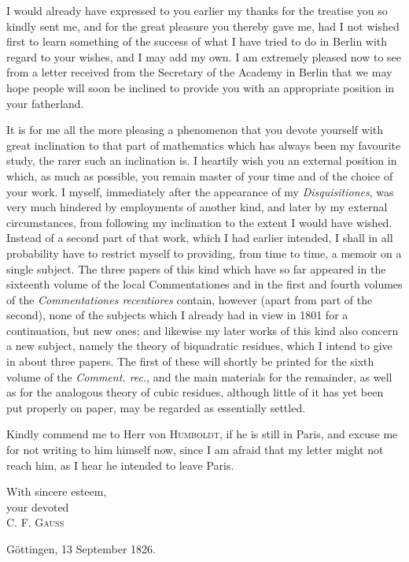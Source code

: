 \documentclass[11pt]{article}
\newcommand{\scn}[1]{\textsc{#1}}
\begin{document}
I would already have expressed to you earlier my thanks for the treatise you so kindly sent me, and for the great pleasure you thereby gave me, had I not wished first to learn something of the success of what I have tried to do in Berlin with regard to your wishes, and I may add my own. I am extremely pleased now to see from a letter received from the Secretary of the Academy in Berlin that we may hope people will soon be inclined to provide you with an appropriate position in your fatherland.

It is for me all the more pleasing a phenomenon that you devote yourself with great inclination to that part of mathematics which has always been my favourite study, the rarer such an inclination is. I heartily wish you an external position in which, as much as possible, you remain master of your time and of the choice of your work. I myself, immediately after the appearance of my \emph{Disquisitiones}, was very much hindered by employments of another kind, and later by my external circumstances, from following my inclination to the extent I would have wished. Instead of a second part of that work, which I had earlier intended, I shall in all probability have to restrict myself to providing, from time to time, a memoir on a single subject. The three papers of this kind which have so far appeared in the sixteenth volume of the local Commentationes and in the first and fourth volumes of the \emph{Commentationes recentiores} contain, however (apart from part of the second), none of the subjects which I already had in view in 1801 for a continuation, but new ones; and likewise my later works of this kind also concern a new subject, namely the theory of biquadratic residues, which I intend to give in about three papers. The first of these will shortly be printed for the sixth volume of the \emph{Comment. rec.}, and the main materials for the remainder, as well as for the analogous theory of cubic residues, although little of it has yet been put properly on paper, may be regarded as essentially settled.

Kindly commend me to Herr von \scn{Humboldt}, if he is still in Paris, and excuse me for not writing to him himself now, since I am afraid that my letter might not reach him, as I hear he intended to leave Paris.

\begin{flushright}
With sincere esteem,\\
your devoted\\
\scn{C. F. Gauss}
\end{flushright}
Göttingen, 13 September 1826.
\end{document}

